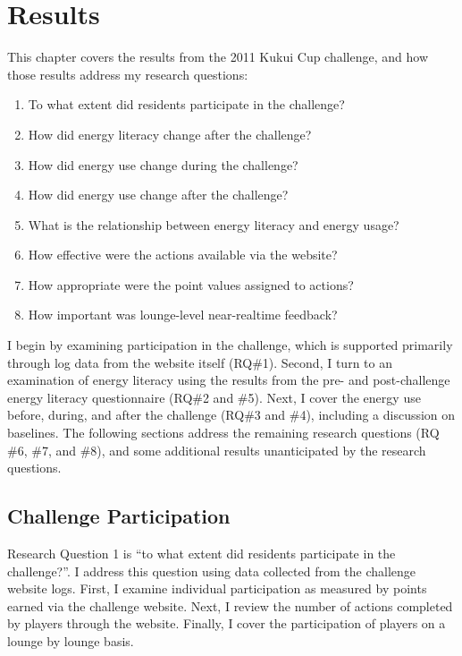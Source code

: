 \chapter{Results}
\label{cha:results}

This chapter covers the results from the 2011 Kukui Cup challenge, and how those results address my research questions:

\begin{enumerate}
	\item To what extent did residents participate in the challenge?
	\item How did energy literacy change after the challenge?
	\item How did energy use change during the challenge?
	\item How did energy use change after the challenge?
	\item What is the relationship between energy literacy and energy usage?
	\item How effective were the actions available via the website?
	\item How appropriate were the point values assigned to actions?
	\item How important was lounge-level near-realtime feedback?
\end{enumerate}

I begin by examining participation in the challenge, which is supported primarily through log data from the website itself (RQ\#1). Second, I turn to an examination of energy literacy using the results from the pre- and post-challenge energy literacy questionnaire (RQ\#2 and \#5). Next, I cover the energy use before, during, and after the challenge (RQ\#3 and \#4), including a discussion on baselines. The following sections address the remaining research questions (RQ \#6, \#7, and \#8), and some additional results unanticipated by the research questions.


\section{Challenge Participation}

Research Question 1 is ``to what extent did residents participate in the challenge?''. I address this question using data collected from the challenge website logs. First, I examine individual participation as measured by points earned via the challenge website. Next, I review the number of actions completed by players through the website. Finally, I cover the participation of players on a lounge by lounge basis.

